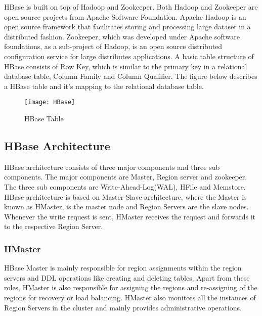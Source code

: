 \documentclass[11pt,a4paper,bibtotoc,idxtotoc,headsepline,footsepline,footexclude,BCOR12mm,DIV13]{scrbook}
\begin{document}
HBase is built on top of Hadoop and Zookeeper\cite{coprocessor:detail}. Both Hadoop and Zookeeper are open source projects from Apache Software Foundation. Apache Hadoop is an open source framework that facilitates storing and processing large dataset in a distributed fashion. Zookeeper, which was developed under Apache software foundations, as a sub-project of Hadoop, is an open source distributed configuration service for large distributes applications. A basic table structure of HBase consists of Row Key, which is similar to the primary key in a relational database table, Column Family and Column Qualifier. The figure below describes a HBase table and it's mapping to the relational database table.


\begin{figure}
	\centering
	\texttt{[image: HBase]}
	\caption{HBase Table}
	\label{fig:hbasetable}
\end{figure}

\newpage
\subsection{HBase Architecture}
\label{HBase Architecture}
HBase architecture consists of three major components and three sub components. The major components are Master, Region server and zookeeper. The three sub components are Write-Ahead-Log(WAL), HFile and Memstore\cite{hbase:insights}. HBase architecture is based on Master-Slave architecture, where the Master is known as HMaster, is the master node and Region Servers are the slave nodes. Whenever the write request is sent, HMaster receives the request and forwards it to the respective Region Server\cite{hbase:insights}. 

\subsubsection{HMaster}
\label{hmaster}
HBase Master is mainly responsible for region assignments within the region servers and DDL operations like creating and deleting tables\cite{hbase:architecture}. Apart from these roles, HMaster is also responsible for assigning the regions and re-assigning of the regions for recovery or load balancing\cite{hbase:architecture}. HMaster also monitors all the instances of Region Servers in the cluster\cite{hbase:architecture} and mainly provides administrative operations.
\end{document}
